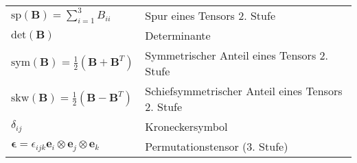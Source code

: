 \begin{tabular}{l l}
$\textrm{sp}(\boldsymbol B)=\sum_{i=1}^{3}B_{ii} $ & Spur eines Tensors 2. Stufe\\[1mm]
$\textrm{det}(\boldsymbol B)$ & Determinante\\[1mm]
$\textrm{sym}(\boldsymbol B) =\frac{1}{2} \left(\boldsymbol B+\boldsymbol B^T\right)$ & Symmetrischer Anteil eines Tensors 2. Stufe\\[1mm]
$\textrm{skw}(\boldsymbol B) =\frac{1}{2} \left(\boldsymbol B-\boldsymbol B^T\right)$ & Schiefsymmetrischer Anteil eines Tensors 2. Stufe\\[5mm]
$\delta_{ij}$ & Kroneckersymbol\\[1mm]
$\boldsymbol \epsilon = \epsilon_{ijk}\boldsymbol e_i\otimes \boldsymbol e_j\otimes\boldsymbol e_k$ & Permutationstensor (3. Stufe)\\[1mm]
\end{tabular}

\cleardoublepage